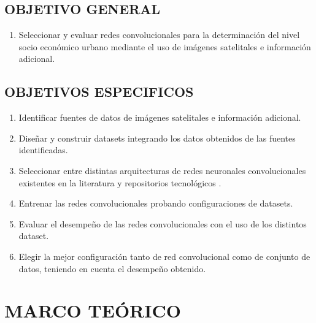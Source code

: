 	\section{OBJETIVO GENERAL}
	\begin{enumerate}
	\item Seleccionar y evaluar redes convolucionales para la determinación del nivel socio económico urbano mediante el uso de imágenes satelitales e información adicional.
	\end{enumerate}
    \section{OBJETIVOS ESPECIFICOS}
    \begin{enumerate}
      \item Identificar fuentes de datos de imágenes satelitales e información adicional.
      \item Diseñar y construir datasets integrando los datos obtenidos de las fuentes identificadas.
      \item Seleccionar entre distintas arquitecturas de redes neuronales convolucionales existentes en la literatura y repositorios tecnológicos    .
      \item Entrenar las redes convolucionales probando configuraciones de datasets.
      \item Evaluar el desempeño de las redes convolucionales con el uso de los distintos dataset. 
      \item Elegir la mejor configuración tanto de red convolucional como de conjunto de datos, teniendo en cuenta el desempeño obtenido.   
    \end{enumerate}
    \newpage\chapter{MARCO TEÓRICO} 
